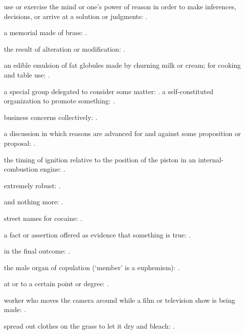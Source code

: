   use or exercise the mind or one's power of reason in order to make inferences, decisions, or arrive at a solution or judgments:   .

  a memorial made of brass:   .

  the result of alteration or modification: .

  an edible emulsion of fat globules made by churning milk or cream; for cooking and table use: .

  a special group delegated to consider some matter:   . a self-constituted organization to promote something:   .

  business concerns collectively:   .

  a discussion in which reasons are advanced for and against some proposition or proposal:   .

  the timing of ignition relative to the position of the piston in an internal-combustion engine:   .

  extremely robust:   .

  and nothing more:   .

  street names for cocaine:   .

  a fact or assertion offered as evidence that something is true:   .

  in the final outcome: .

  the male organ of copulation (`member' is a euphemism):   .

  at or to a certain point or degree: .

  worker who moves the camera around while a film or television show is being made: .

  spread out clothes on the grass to let it dry and bleach: .

